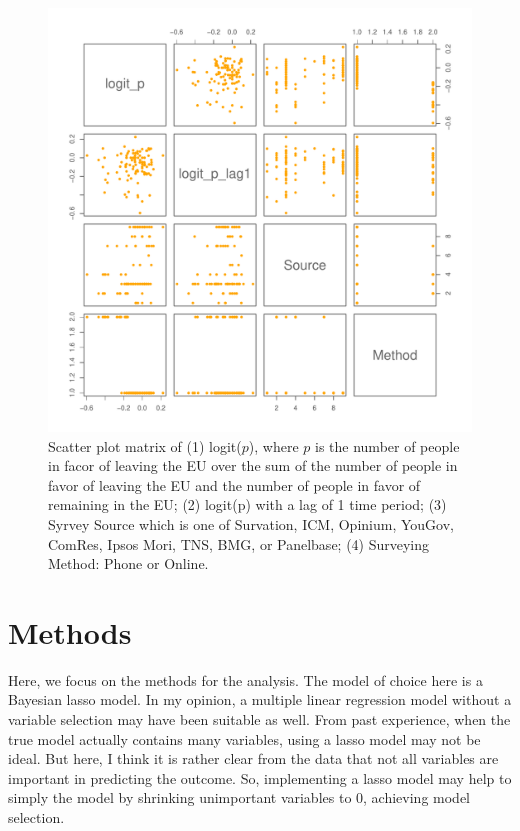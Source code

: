\documentclass{../../tex_template/asaproc}
\begin{document}
\begin{figure}[H]
  \includegraphics[scale=.5]{figs/pairs.pdf}
  \caption{\small Scatter plot matrix of (1) logit($p$), where $p$ is the
    number of people in facor of leaving the EU over the sum of the number of
    people in favor of leaving the EU and the number of people in favor of
    remaining in the EU; (2) logit(p) with a lag of 1 time period; (3) Syrvey
    Source which is one of Survation, ICM, Opinium, YouGov, ComRes, Ipsos Mori,
    TNS, BMG, or Panelbase; (4) Surveying Method: Phone or Online.}
  \label{fig:pairs}
\end{figure}

\section{Methods}
Here, we focus on the methods for the analysis. The model of choice here is a
Bayesian lasso model. In my opinion, a multiple linear regression model without
a variable selection may have been suitable as well. From past experience, when
the true model actually contains many variables, using a lasso model may not be
ideal. But here, I think it is rather clear from the data that not all
variables are important in predicting the outcome. So, implementing a lasso
model may help to simply the model by shrinking unimportant variables to 0,
achieving model selection. \\
\end{document}

